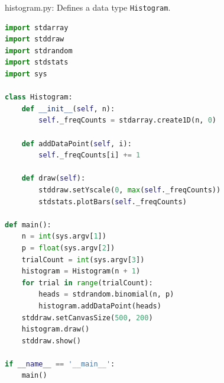 \documentclass[8pt,a4paper,compress,handout]{beamer}
\begin{document}
\begin{frame}[fragile]
\begin{framed}
\tiny histogram.py: Defines a data type \lstinline{Histogram}.
\end{framed}

\begin{lstlisting}[language=Python]
import stdarray
import stddraw
import stdrandom
import stdstats
import sys

class Histogram:
    def __init__(self, n):
        self._freqCounts = stdarray.create1D(n, 0)

    def addDataPoint(self, i):
        self._freqCounts[i] += 1

    def draw(self):
        stddraw.setYscale(0, max(self._freqCounts))
        stdstats.plotBars(self._freqCounts)

def main():
    n = int(sys.argv[1]) 
    p = float(sys.argv[2])
    trialCount = int(sys.argv[3]) 
    histogram = Histogram(n + 1)
    for trial in range(trialCount):
        heads = stdrandom.binomial(n, p)
        histogram.addDataPoint(heads)
    stddraw.setCanvasSize(500, 200)
    histogram.draw()
    stddraw.show()

if __name__ == '__main__':
    main()
\end{lstlisting}
\end{frame}
\end{document}

